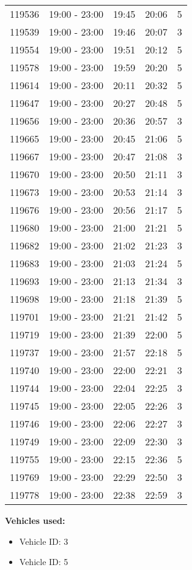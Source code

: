 \documentclass{article}
\begin{document}
\begin{tabular}{llccc}
119536 & 19:00 - 23:00 & 19:45 & 20:06 & 5 \\
119539 & 19:00 - 23:00 & 19:46 & 20:07 & 3 \\
119554 & 19:00 - 23:00 & 19:51 & 20:12 & 5 \\
119578 & 19:00 - 23:00 & 19:59 & 20:20 & 5 \\
119614 & 19:00 - 23:00 & 20:11 & 20:32 & 5 \\
119647 & 19:00 - 23:00 & 20:27 & 20:48 & 5 \\
119656 & 19:00 - 23:00 & 20:36 & 20:57 & 3 \\
119665 & 19:00 - 23:00 & 20:45 & 21:06 & 5 \\
119667 & 19:00 - 23:00 & 20:47 & 21:08 & 3 \\
119670 & 19:00 - 23:00 & 20:50 & 21:11 & 3 \\
119673 & 19:00 - 23:00 & 20:53 & 21:14 & 3 \\
119676 & 19:00 - 23:00 & 20:56 & 21:17 & 5 \\
119680 & 19:00 - 23:00 & 21:00 & 21:21 & 5 \\
119682 & 19:00 - 23:00 & 21:02 & 21:23 & 3 \\
119683 & 19:00 - 23:00 & 21:03 & 21:24 & 5 \\
119693 & 19:00 - 23:00 & 21:13 & 21:34 & 3 \\
119698 & 19:00 - 23:00 & 21:18 & 21:39 & 5 \\
119701 & 19:00 - 23:00 & 21:21 & 21:42 & 5 \\
119719 & 19:00 - 23:00 & 21:39 & 22:00 & 5 \\
119737 & 19:00 - 23:00 & 21:57 & 22:18 & 5 \\
119740 & 19:00 - 23:00 & 22:00 & 22:21 & 3 \\
119744 & 19:00 - 23:00 & 22:04 & 22:25 & 3 \\
119745 & 19:00 - 23:00 & 22:05 & 22:26 & 3 \\
119746 & 19:00 - 23:00 & 22:06 & 22:27 & 3 \\
119749 & 19:00 - 23:00 & 22:09 & 22:30 & 3 \\
119755 & 19:00 - 23:00 & 22:15 & 22:36 & 5 \\
119769 & 19:00 - 23:00 & 22:29 & 22:50 & 3 \\
119778 & 19:00 - 23:00 & 22:38 & 22:59 & 3 \\
\bottomrule
\end{tabular}

\textbf{Vehicles used:}
\begin{itemize}
  \item Vehicle ID: 3
  \item Vehicle ID: 5
\end{itemize}
\end{document}
